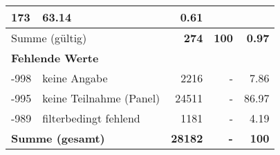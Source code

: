 \begin{longtable}{lXrrr}
       \num{173} &
       \num[round-mode=places,round-precision=2]{63.14} &
         \num[round-mode=places,round-precision=2]{0.61} \\
     \midrule
     \multicolumn{2}{l}{Summe (gültig)} &
       \textbf{\num{274}} &
     \textbf{100} &
       \textbf{\num[round-mode=places,round-precision=2]{0.97}} \\
     \multicolumn{5}{l}{\textbf{Fehlende Werte}}\\
       -998 &
       keine Angabe &
         \num{2216} &
        - &
         \num[round-mode=places,round-precision=2]{7.86} \\
       -995 &
       keine Teilnahme (Panel) &
         \num{24511} &
        - &
         \num[round-mode=places,round-precision=2]{86.97} \\
       -989 &
       filterbedingt fehlend &
         \num{1181} &
        - &
         \num[round-mode=places,round-precision=2]{4.19} \\
     \midrule
     \multicolumn{2}{l}{\textbf{Summe (gesamt)}} &
          \textbf{\num{28182}} &
        \textbf{-} &
        \textbf{100} \\
     \bottomrule
     \end{longtable}
     

